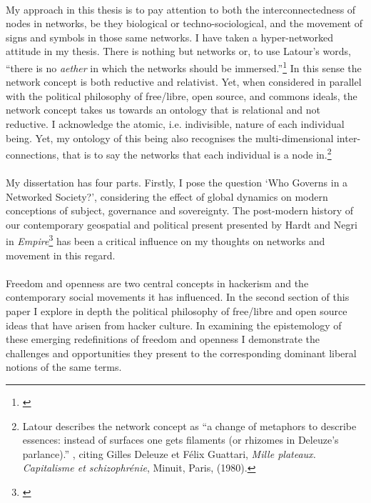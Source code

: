 \paragraph{}My approach in this thesis is to pay attention to both the interconnectedness of nodes in networks, be they biological or techno-sociological, and the movement of signs and symbols in those same networks. I have taken a hyper-networked attitude in my thesis. There is nothing but networks or, to use Latour's words, ``there is no \textit{aether} in which the networks should be immersed.''\footnote{\cite{latour:1998ant1}} In this sense the network concept is both reductive and relativist. Yet, when considered in parallel with the political philosophy of free/libre, open source, and commons ideals, the network concept takes us towards an ontology that is relational and not reductive. I acknowledge the atomic, i.e. indivisible, nature of each individual being. Yet, my ontology of this being also recognises the multi-dimensional inter-connections, that is to say the networks that each individual is a node in.\footnote{Latour describes the network concept as  ``a change of metaphors to describe essences: instead of surfaces one gets filaments (or rhizomes in Deleuze's parlance).'' \cite{latour:1998ant1}, citing Gilles Deleuze et F\'{e}lix Guattari, \textit{Mille plateaux. Capitalisme et schizophr\'{e}nie}, Minuit, Paris, (1980).}

\paragraph{}My dissertation has four parts. Firstly, I pose the question `Who Governs in a Networked Society?', considering the effect of global dynamics on modern conceptions of subject, governance and sovereignty. The post-modern history of our contemporary geospatial and political present presented by Hardt and Negri in \textit{Empire}\footnote{\cite{Hardt:2001jl}} has been a critical influence on my thoughts on networks and movement in this regard.

\paragraph{}Freedom and openness are two central concepts in hackerism and the contemporary social movements it has influenced. In the second section of this paper I explore in depth the political philosophy of free/libre and open source ideas that have arisen from hacker culture. In examining the epistemology of these emerging redefinitions of freedom and openness I demonstrate the challenges and opportunities they present to the corresponding dominant liberal notions of the same terms.

